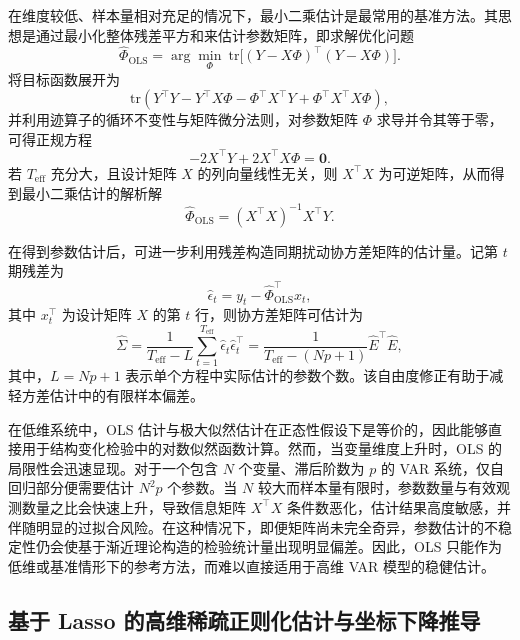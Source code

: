 \documentclass[UTF8,a4paper,12pt]{ctexbook}
\begin{document}
在维度较低、样本量相对充足的情况下，最小二乘估计是最常用的基准方法。其思想是通过最小化整体残差平方和来估计参数矩阵，即求解优化问题
\begin{equation}
 \hat{\Phi}_{\mathrm{OLS}}=\arg\min_{\Phi}\ \mathrm{tr}\bigl[(Y-X\Phi)^{\top}(Y-X\Phi)\bigr].
\end{equation}
将目标函数展开为
\begin{equation}
 \mathrm{tr}\left(Y^{\top}Y-Y^{\top}X\Phi-\Phi^{\top}X^{\top}Y+\Phi^{\top}X^{\top}X\Phi\right),
\end{equation}
并利用迹算子的循环不变性与矩阵微分法则，对参数矩阵 $\Phi$ 求导并令其等于零，可得正规方程
\begin{equation}
 -2X^{\top}Y+2X^{\top}X\Phi=\bm{0}.
\end{equation}
若 $T_{\mathrm{eff}}$ 充分大，且设计矩阵 $X$ 的列向量线性无关，则 $X^{\top}X$ 为可逆矩阵，从而得到最小二乘估计的解析解
\begin{equation}
 \hat{\Phi}_{\mathrm{OLS}}=(X^{\top}X)^{-1}X^{\top}Y.
\end{equation}

在得到参数估计后，可进一步利用残差构造同期扰动协方差矩阵的估计量。记第 $t$ 期残差为
\begin{equation}
 \hat{\epsilon}_t=y_t-\hat{\Phi}_{\mathrm{OLS}}^{\top}x_t,
\end{equation}
其中 $x_t^{\top}$ 为设计矩阵 $X$ 的第 $t$ 行，则协方差矩阵可估计为
\begin{equation}
 \hat{\Sigma}=\frac{1}{T_{\mathrm{eff}}-L}\sum_{t=1}^{T_{\mathrm{eff}}}\hat{\epsilon}_t\hat{\epsilon}_t^{\top}
 =\frac{1}{T_{\mathrm{eff}}-(Np+1)}\hat{E}^{\top}\hat{E},
\end{equation}
其中，$L=Np+1$ 表示单个方程中实际估计的参数个数。该自由度修正有助于减轻方差估计中的有限样本偏差。

在低维系统中，OLS 估计与极大似然估计在正态性假设下是等价的，因此能够直接用于结构变化检验中的对数似然函数计算。然而，当变量维度上升时，OLS 的局限性会迅速显现。对于一个包含 $N$ 个变量、滞后阶数为 $p$ 的 VAR 系统，仅自回归部分便需要估计 $N^2p$ 个参数。当 $N$ 较大而样本量有限时，参数数量与有效观测数量之比会快速上升，导致信息矩阵 $X^{\top}X$ 条件数恶化，估计结果高度敏感，并伴随明显的过拟合风险。在这种情况下，即便矩阵尚未完全奇异，参数估计的不稳定性仍会使基于渐近理论构造的检验统计量出现明显偏差。因此，OLS 只能作为低维或基准情形下的参考方法，而难以直接适用于高维 VAR 模型的稳健估计。

\subsection{基于 Lasso 的高维稀疏正则化估计与坐标下降推导}
\end{document}
